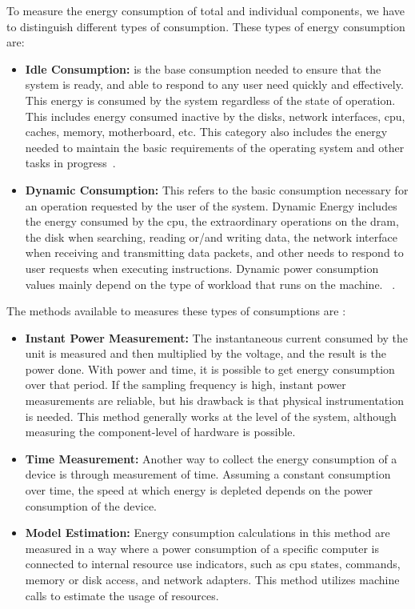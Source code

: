 


To measure the energy consumption of total and individual components, we have to distinguish different types of consumption.  These types of energy consumption are:

\begin{itemize}
    \item \textbf{Idle Consumption:} is the base consumption needed to ensure that the system is ready, and able to respond to any user need quickly and effectively. This energy is consumed by the system regardless of the state of operation. This includes energy consumed inactive by the disks, network interfaces, \gls{cpu}, caches, memory, motherboard, etc. This category also includes the energy needed to maintain the basic requirements of the operating system and other tasks in progress~\cite{portela2016}.
    
   \item \textbf{Dynamic Consumption:} This refers to the basic consumption necessary for an operation requested by the user of the system. Dynamic Energy includes the energy consumed by the \gls{cpu}, the extraordinary operations on the \gls{dram}, the disk when searching, reading or/and writing data, the network interface when receiving and transmitting data packets, and other needs to respond to user requests when executing instructions. Dynamic power consumption values mainly depend on the type of workload that runs on the machine. ~\cite{portela2016}.
  \end{itemize}
  


The methods available to measures these types of consumptions are \cite{ardito2019methodological}:

\begin{itemize}
    \item \textbf{Instant Power Measurement:} The instantaneous current consumed by the unit is measured and then multiplied by the voltage, and the result is the power done.
    With power and time, it is possible to get energy consumption over that period. If the sampling frequency is high, instant power measurements are reliable, but his drawback is that physical instrumentation is needed.  This method generally works at the level of the system, although measuring the component-level of hardware is possible.
    
    \item \textbf{Time Measurement:} Another way to collect the energy consumption of a device is through measurement of time. Assuming a constant consumption over time, the speed at which energy is depleted depends on the power consumption of the device. 
    \item \textbf{Model Estimation:} Energy consumption calculations in this method are measured in a way where a power consumption of a specific computer is connected to internal resource use indicators, such as \gls{cpu} states, commands, memory or disk access, and network adapters. This method utilizes machine calls to estimate the usage of resources.
\end{itemize}


